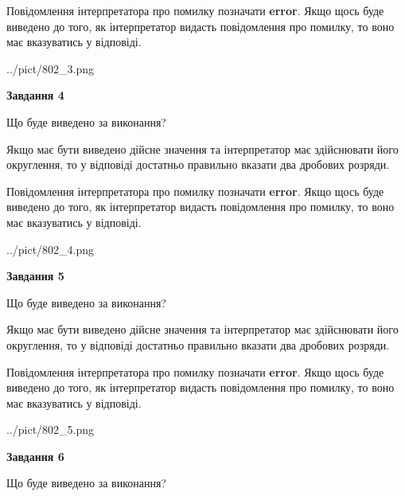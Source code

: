 \documentclass[12pt, ukrainian]{article}
\begin{document}
{\begin {Large}
Повідомлення інтерпретатора про помилку позначати \textbf{error}.
Якщо щось буде виведено до того, як інтерпретатор видасть повідомлення про помилку, 
то воно має вказуватись у відповіді. \par

\begin{center}
	{../pict/802_3.png}
\end{center}
\newpage

{\begin {center}\textbf{Завдання 4}\end {center}}\par
Що буде виведено за виконання? \par

Якщо має бути виведено дійсне значення та інтерпретатор має здійснювати його округлення, 
то у відповіді достатньо правильно вказати два дробових розряди.

Повідомлення інтерпретатора про помилку позначати \textbf{error}.
Якщо щось буде виведено до того, як інтерпретатор видасть повідомлення про помилку, 
то воно має вказуватись у відповіді. \par

\begin{center}
	{../pict/802_4.png}
\end{center}
\newpage

{\begin {center}\textbf{Завдання 5}\end {center}}\par
Що буде виведено за виконання? \par

Якщо має бути виведено дійсне значення та інтерпретатор має здійснювати його округлення, 
то у відповіді достатньо правильно вказати два дробових розряди.

Повідомлення інтерпретатора про помилку позначати \textbf{error}.
Якщо щось буде виведено до того, як інтерпретатор видасть повідомлення про помилку, 
то воно має вказуватись у відповіді. \par

\begin{center}
	{../pict/802_5.png}
\end{center}
\newpage

{\begin {center}\textbf{Завдання 6}\end {center}}\par
Що буде виведено за виконання? \par


\end{Large}}
\end{document}
